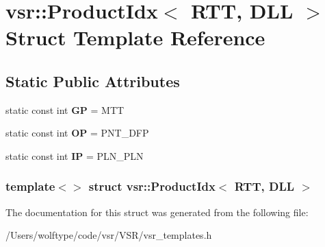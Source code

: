 \hypertarget{structvsr_1_1_product_idx_3_01_r_t_t_00_01_d_l_l_01_4}{\section{vsr\-:\-:Product\-Idx$<$ R\-T\-T, D\-L\-L $>$ Struct Template Reference}
\label{structvsr_1_1_product_idx_3_01_r_t_t_00_01_d_l_l_01_4}
}
\subsection*{Static Public Attributes}
\begin{DoxyCompactItemize}
\item 
\hypertarget{structvsr_1_1_product_idx_3_01_r_t_t_00_01_d_l_l_01_4_a8f3e6c8a033b4b21010f439bfefea0f3}{static const int {\bfseries G\-P} = M\-T\-T}\label{structvsr_1_1_product_idx_3_01_r_t_t_00_01_d_l_l_01_4_a8f3e6c8a033b4b21010f439bfefea0f3}

\item 
\hypertarget{structvsr_1_1_product_idx_3_01_r_t_t_00_01_d_l_l_01_4_a4cc0b93e4614df6e679042e991a7e309}{static const int {\bfseries O\-P} = P\-N\-T\-\_\-\-D\-F\-P}\label{structvsr_1_1_product_idx_3_01_r_t_t_00_01_d_l_l_01_4_a4cc0b93e4614df6e679042e991a7e309}

\item 
\hypertarget{structvsr_1_1_product_idx_3_01_r_t_t_00_01_d_l_l_01_4_a7aab419edf35e87cb91769fba5800dbd}{static const int {\bfseries I\-P} = P\-L\-N\-\_\-\-P\-L\-N}\label{structvsr_1_1_product_idx_3_01_r_t_t_00_01_d_l_l_01_4_a7aab419edf35e87cb91769fba5800dbd}

\end{DoxyCompactItemize}
\subsubsection*{template$<$$>$ struct vsr\-::\-Product\-Idx$<$ R\-T\-T, D\-L\-L $>$}



The documentation for this struct was generated from the following file\-:\begin{DoxyCompactItemize}
\item 
/\-Users/wolftype/code/vsr/\-V\-S\-R/vsr\-\_\-templates.\-h\end{DoxyCompactItemize}
